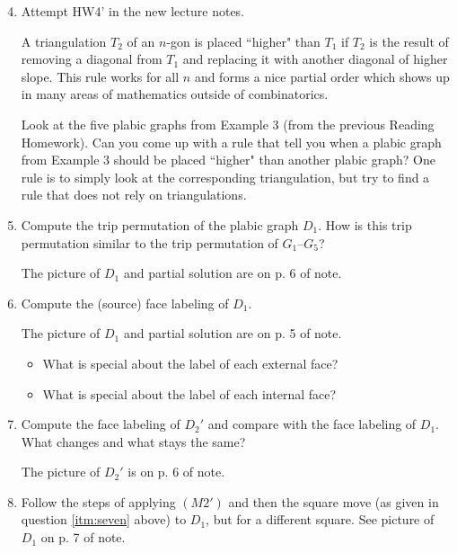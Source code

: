 \documentclass[10pt]{amsart}
\begin{document}
\begin{enumerate}
\setcounter{enumi}{3}
\item 
Attempt HW4' in the new lecture notes.

A triangulation $T_2$ of an $n$-gon is placed ``higher" than $T_1$ 
if $T_2$ is the result of removing a diagonal from $T_1$ and replacing it with another diagonal of higher slope.
This rule works for all $n$ and forms a nice partial order which shows up in many areas of mathematics outside of combinatorics. 

Look at the five plabic graphs from Example 3 (from the previous Reading Homework). Can you come up with a rule that tell you when a plabic graph from Example 3 should be placed ``higher" than another plabic graph? One rule is to simply look at the corresponding triangulation, but try to find a rule that does not rely on triangulations.

\bigskip
	
\item 
Compute the trip permutation of the plabic graph $D_1$. 
How is this trip permutation similar to the trip permutation of $G_1$--$G_5$?

The picture of $D_1$ and partial solution are on p. 6 of note.

\bigskip
	
\item 
Compute the (source) face labeling of $D_1$.

The picture of $D_1$ and partial solution are on p. 5 of note.


\begin{itemize}
\item
What is special about the label of each external face?
\item 
What is special about the label of each internal face?
\end{itemize}

\bigskip

\item \label{itm:seven}
Compute the face labeling of $D_2'$ and compare with the face labeling of $D_1$. 
What changes and what stays the same? 

The picture of $D_2'$ is on p. 6 of note. 


\bigskip 

\item
Follow the steps of applying $(M2')$ and then the square move (as given in question \ref{itm:seven} above) to $D_1$, but for a different square. See picture of $D_1$ on p. 7 of note.





\end{enumerate}
\end{document}
